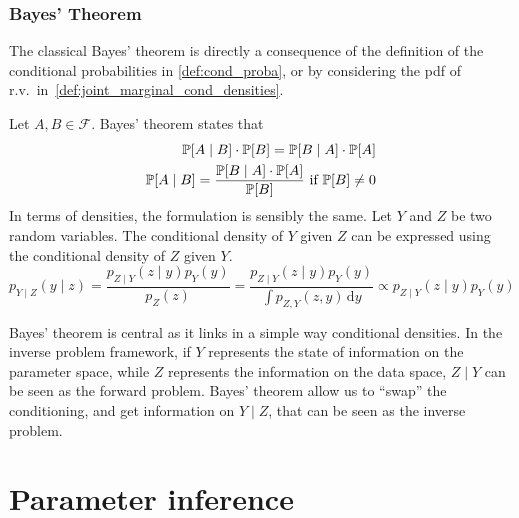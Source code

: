 \documentclass[../../Main_ManuscritThese.tex]{subfiles}
\begin{document}
\subsubsection{Bayes' Theorem}
\label{ssec:bayes_theorem}

The classical Bayes' theorem is directly a consequence of the definition of the conditional probabilities in \cref{def:cond_proba}, or by considering the pdf of r.v.\ in~\cref{def:joint_marginal_cond_densities}.

\begin{theorem}
  Let $A, B\in\mathcal{F}$. Bayes' theorem states that
  \begin{align*}
    \mathbb{P}[A\mid B]\cdot \mathbb{P}[B] = \mathbb{P}[B \mid A]\cdot\mathbb{P}[A] \\
    \mathbb{P}[A \mid B] = \frac{\mathbb{P}[B \mid A]\cdot\mathbb{P}[A]}{\mathbb{P}[B]} \text{ if } \mathbb{P}[B] \neq 0
  \end{align*}
 In terms of densities, the formulation is sensibly the same.
  Let $Y$ and $Z$ be two random variables. The conditional density of $Y$ given $Z$ can be expressed using the conditional density of $Z$ given $Y$.
  \begin{equation}
    p_{Y\mid Z}(y \mid z) = \frac{p_{Z\mid Y}(z\mid y) p_Y(y)}{p_Z(z)} = \frac{p_{Z\mid Y}(z\mid y) p_Y(y)}{\int p_{Z,Y}(z,y) \,\mathrm{d}y}  \propto p_{Z\mid Y}(z\mid y) p_Y(y)
  \end{equation}
\end{theorem}
Bayes' theorem is central as it links in a simple way conditional densities. In the inverse problem framework, if $Y$ represents the state of information on the parameter space, while $Z$ represents the information on the data space, $Z\mid Y$ can be seen as the forward problem. Bayes' theorem allow us to ``swap'' the conditioning, and get information on $Y\mid Z$, that can be seen as the inverse problem.

\section{Parameter inference}
\end{document}
